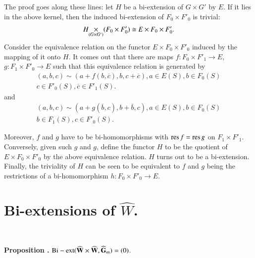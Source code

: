 The proof goes along these lines: let $H$ be a bi-extension of $G\times G'$ by $E$. If it lies in the above kernel, then the induced bi-extension of $F_{0}\times F'_{0}$ is trivial:
$$
\fprod{H}{(F_{0}\times F'_{0})}{(G\times G')}\cong E\times F_{0}\times F'_{0}.
$$
Consider the equivalence relation on the functor $E\times F_{0}\times F'_{0}$ induced by the mapping of it onto $H$. It comes out that there are maps $f:F_{0}\times F'_{1}\to E$, $g:F_{1}\times F'_{0}\to E$ such that this equivalence relation is generated by
\begin{multline}
(a,b,c)\sim (a+f(b,\overline{c}),b,c+\overline{c}),a\in E(S),b\in F_{0}(S)\\
c\in F'_{0}(S),\overline{c}\in F'_{1}(S).\label{art15-eq1}
\end{multline}
and
\begin{multline}
(a,b,c)\sim (a+g(\overline{b},c),b+\overline{b},c), a\in E(S), b\in F_{0}(S)\\
b\in F_{1}(S), c\in F'_{0}(S).\label{art15-eq2}
\end{multline}

Moreover, $f$ and $g$ have to be bi-homomorphisms with $\operatorname{\mathrm{res}} f=\operatorname{\mathrm{res}} g$ on $F_{1}\times F'_{1}$. Conversely, given such $g$ and $g$, define the functor $H$ to be the quotient of $E\times F_{0}\times F'_{0}$ by the above equivalence relation. $H$ turns out to be a bi-extension. Finally, the triviality of $H$ can be seen to be equivalent to $f$ and $g$ being the restrictions of a bi-homomorphism $h:F_{0}\times F'_{0}\to E$.

\section{Bi-extensions of \texorpdfstring{$\widehat{W}$}{W}.}\label{art15-sec4}

~
\bigskip

\noindent
{\bf Proposition .\label{art15-prop2}}
${\rm Bi-ext } (\widehat{\mathbf{W}}\times \widehat{\mathbf{W}},\widehat{\mathbf{G}}_{m})=(0)$.

